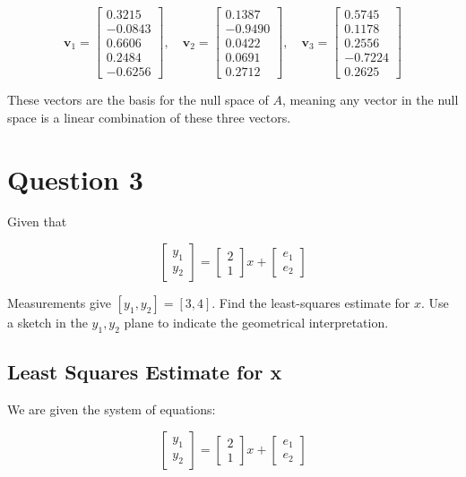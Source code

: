 \documentclass{article}
\begin{document}
\[
\mathbf{v}_1 = 
\begin{bmatrix}
0.3215 \\
-0.0843 \\
0.6606 \\
0.2484 \\
-0.6256
\end{bmatrix}
, \quad
\mathbf{v}_2 = 
\begin{bmatrix}
0.1387 \\
-0.9490 \\
0.0422 \\
0.0691 \\
0.2712
\end{bmatrix}
, \quad
\mathbf{v}_3 = 
\begin{bmatrix}
0.5745 \\
0.1178 \\
0.2556 \\
-0.7224 \\
0.2625
\end{bmatrix}
\]

These vectors are the basis for the null space of \( A \), meaning any vector in the null space is a linear combination of these three vectors.

\section{Question 3}

Given that

\[
\begin{bmatrix}
y_1 \\
y_2
\end{bmatrix}
=
\begin{bmatrix}
2 \\
1
\end{bmatrix}
x +
\begin{bmatrix}
e_1 \\
e_2
\end{bmatrix}
\]

Measurements give \( [y_1, y_2] = [3, 4] \). Find the least-squares estimate for \( x \). Use a sketch in the \( y_1, y_2 \) plane to indicate the geometrical interpretation.

\subsection{Least Squares Estimate for x}

We are given the system of equations:

\[
\begin{bmatrix}
y_1 \\
y_2
\end{bmatrix}
=
\begin{bmatrix}
2 \\
1
\end{bmatrix}
x +
\begin{bmatrix}
e_1 \\
e_2
\end{bmatrix}
\]
\end{document}
